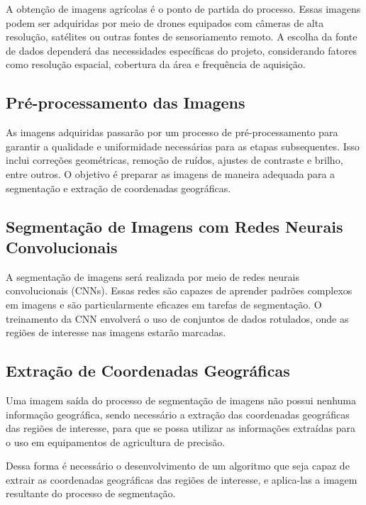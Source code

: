 \documentclass[conference]{IEEEtran}
\begin{document}
A obtenção de imagens agrícolas é o ponto de partida do processo. 
Essas imagens podem ser adquiridas por meio de drones equipados com câmeras de alta resolução, 
satélites ou outras fontes de sensoriamento remoto. A escolha da fonte de dados dependerá das 
necessidades específicas do projeto, considerando fatores como resolução espacial, 
cobertura da área e frequência de aquisição.

\subsection{Pré-processamento das Imagens}
As imagens adquiridas passarão por um processo de pré-processamento para garantir a qualidade 
e uniformidade necessárias para as etapas subsequentes. Isso inclui correções geométricas, 
remoção de ruídos, ajustes de contraste e brilho, entre outros. O objetivo é preparar as 
imagens de maneira adequada para a segmentação e extração de coordenadas geográficas.

\subsection{Segmentação de Imagens com Redes Neurais Convolucionais}
A segmentação de imagens será realizada por meio de redes neurais convolucionais (CNNs). 
Essas redes são capazes de aprender padrões complexos em imagens e são particularmente eficazes 
em tarefas de segmentação. O treinamento da CNN envolverá o uso de conjuntos de dados rotulados, 
onde as regiões de interesse nas imagens estarão marcadas.

\subsection{Extração de Coordenadas Geográficas}
Uma imagem saída do processo de segmentação de imagens não possui nenhuma informação geográfica, 
sendo necessário a extração das coordenadas geográficas das regiões de interesse, para que se possa 
utilizar as informações extraídas para o uso em equipamentos de agricultura de precisão.

Dessa forma é necessário o desenvolvimento de um algoritmo que seja capaz de extrair as coordenadas 
geográficas das regiões de interesse, e aplica-las a imagem resultante do processo de segmentação.

\end{document}
